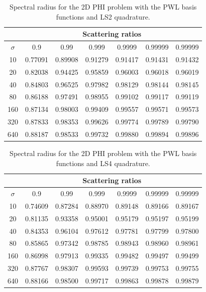 \begin{table}
\caption{Spectral radius for the 2D PHI problem with the PWL basis functions and LS2 quadrature.}
\begin{center}
\def\arraystretch{1.6}
\begin{tabular}{|c|c|c|c|c|c|c|}
\hline
& \multicolumn{6}{c}{Scattering ratios}\vline\\
\hline
$\sigma$ & 0.9 & 0.99& 0.999& 0.9999& 0.99999& 0.99999 \\
\hline
10  &0.77091&0.89908&0.91279&0.91417&0.91431&0.91432 \\
20  &0.82038&0.94425&0.95859&0.96003&0.96018&0.96019  \\
40  &0.84803&0.96525&0.97982&0.98129&0.98144&0.98145  \\
80  &0.86188&0.97491&0.98955&0.99102&0.99117&0.99119  \\
160&0.87134&0.98003&0.99409&0.99557&0.99571&0.99573  \\
320&0.87833&0.98353&0.99626&0.99774&0.99789&0.99790  \\
640&0.88187&0.98533&0.99732&0.99880&0.99894&0.99896  \\
\hline
\end{tabular}
\end{center}
\label{tab::DSA_2DPHI_LS2}
\end{table}

\begin{table}
\caption{Spectral radius for the 2D PHI problem with the PWL basis functions and LS4 quadrature.}
\begin{center}
\def\arraystretch{1.6}
\begin{tabular}{|c|c|c|c|c|c|c|}
\hline
& \multicolumn{6}{c}{Scattering ratios}\vline\\
\hline
$\sigma$ & 0.9 & 0.99& 0.999& 0.9999& 0.99999& 0.99999 \\
\hline
10  &0.74609&0.87284&0.88970&0.89148&0.89166&0.89167\\
20  &0.81135&0.93358&0.95001&0.95179&0.95197&0.95199\\
40  &0.84353&0.96104&0.97612&0.97781&0.97799&0.97800\\
80  &0.85865&0.97342&0.98785&0.98943&0.98960&0.98961\\
160&0.86998&0.97913&0.99335&0.99482&0.99497&0.99499\\
320&0.87767&0.98307&0.99593&0.99739&0.99753&0.99755\\
640&0.88166&0.98500&0.99717&0.99863&0.99878&0.99879\\
\hline
\end{tabular}
\end{center}
\label{tab::DSA_2DPHI_LS4}
\end{table}

